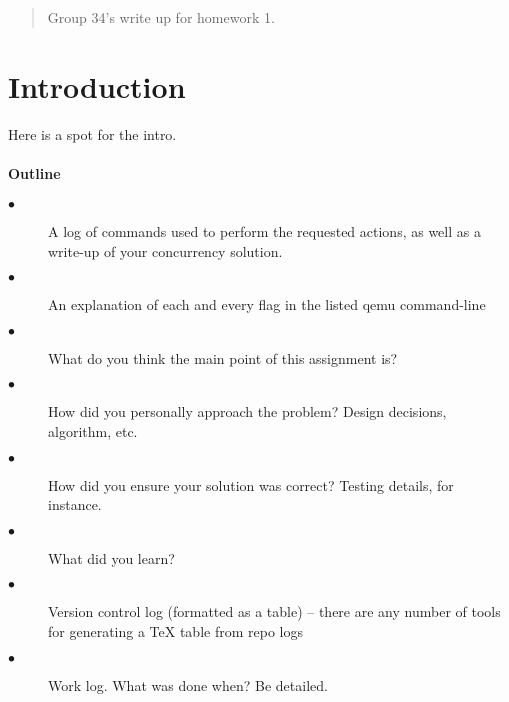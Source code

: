 \documentclass[10pt]{article}
\begin{document}
\maketitle

\begin{abstract}
Group 34's write up for homework 1.
\end{abstract}

\section{Introduction}
Here is a spot for the intro.

\paragraph{Outline}

\begin{description}
  \item[$\bullet$] A log of commands used to perform the requested actions, as well as a write-up of your concurrency solution.
  \item[$\bullet$] An explanation of each and every flag in the listed qemu command-line
  \item[$\bullet$] What do you think the main point of this assignment is?
  \item[$\bullet$] How did you personally approach the problem? Design decisions, algorithm, etc.
  \item[$\bullet$] How did you ensure your solution was correct? Testing details, for instance.
  \item[$\bullet$] What did you learn?
  \item[$\bullet$] Version control log (formatted as a table) -- there are any number of tools for generating a TeX table from repo logs
  \item[$\bullet$] Work log. What was done when? Be detailed.
\end{description}
\end{document}
